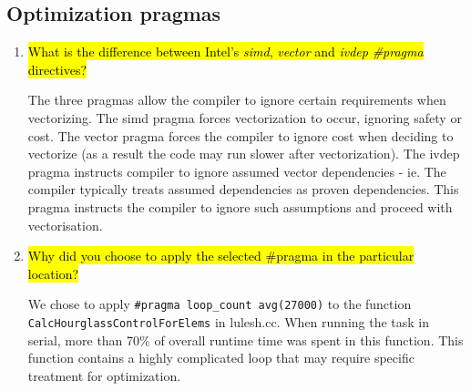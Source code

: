 \documentclass{article}
\begin{document}
\subsection{Optimization pragmas}
\begin{enumerate}
	\item \hl{What is the difference between Intel's \emph{simd}, \emph{vector} and \emph{ivdep} \emph{\#pragma} directives?}

	The three pragmas allow the compiler to ignore certain requirements when vectorizing. The simd pragma forces vectorization to occur, ignoring safety or cost. The vector pragma forces the compiler to ignore cost when deciding to vectorize (as a result the code may run slower after vectorization). The ivdep pragma instructs compiler to ignore assumed vector dependencies - ie. The compiler typically treats assumed dependencies as proven dependencies. This pragma instructs the compiler to ignore such assumptions and proceed with vectorisation.
	\item \hl{Why did you choose to apply the selected \#pragma in the particular location?}

	We chose to apply \verb!#pragma loop_count avg(27000)! to the function \verb!CalcHourglassControlForElems! in lulesh.cc. When running the task in serial, more than 70\% of overall runtime time was spent in this function. This function contains a highly complicated loop that may require specific treatment for optimization.
\end{enumerate}
\end{document}
